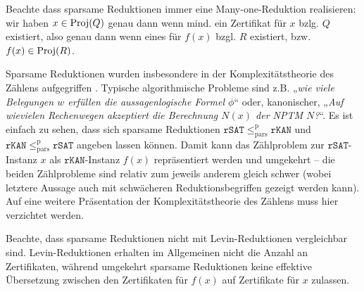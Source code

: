 Beachte dass sparsame Reduktionen immer eine Many-one-Reduktion realisieren: wir haben $x\in\operatorname{Proj}(Q)$ genau dann wenn mind. ein Zertifikat für $x$ bzlg. $Q$ existiert, also genau dann wenn eines für $f(x)$ bzgl. $R$ existiert, bzw. $f(x)\in\operatorname{Proj}(R)$.

Sparsame Reduktionen wurden insbesondere in der Komplexitätstheorie des Zählens aufgegriffen \parencites{simon_central_1975}{valiant_complexity_1979}. Typische algorithmische Probleme sind z.B. „\emph{wie viele Belegungen $w$ erfüllen die aussagenlogische Formel $\phi$}“ oder, kanonischer, „\emph{Auf wievielen Rechenwegen akzeptiert die Berechnung $N(x)$ der NPTM $N$?}“. Es ist einfach zu sehen, dass sich sparsame Reduktionen $\mathtt{rSAT}\leq_\mathrm{pars}^\mathrm p \mathtt{rKAN}$ und $\mathtt{rKAN}\leq_\mathrm{pars}^\mathrm p \mathtt{rSAT}$ angeben lassen können. Damit kann das Zählproblem zur $\mathtt{rSAT}$-Instanz $x$ als $\mathtt{rKAN}$-Instanz $f(x)$ repräsentiert werden und umgekehrt -- die beiden Zählprobleme sind relativ zum jeweils anderem gleich schwer (wobei letztere Aussage auch mit schwächeren Reduktionsbegriffen gezeigt werden kann). Auf eine weitere Präsentation der Komplexitätstheorie des Zählens muss hier verzichtet werden.

Beachte, dass sparsame Reduktionen nicht mit Levin-Reduktionen vergleichbar sind. Levin-Reduktionen erhalten im Allgemeinen nicht die Anzahl an Zertifikaten, während umgekehrt sparsame Reduktionen keine effektive Übersetzung zwischen den Zertifikaten für $f(x)$ auf Zertifikate für $x$ zulassen.
%

